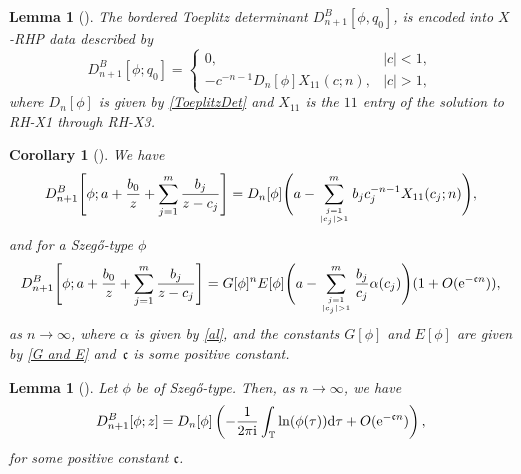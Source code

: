 \documentclass[10pt,a4paper]{amsart}
\numberwithin{equation}{section}
\newtheorem{Corollary}[Theorem]{Corollary}
\newtheorem{Lemma}[Theorem]{Lemma}
 { \theoremstyle{definition}
\newtheorem{Definition}[Theorem]{Definition}
\newtheorem{Example}[Theorem]{Example}
\newtheorem{Remark}[Theorem]{Remark}
\newtheorem{Question}[Theorem]{Question}
}
\newcommand{\T}{{\mathbb T}}
\newcommand{\al}{\alpha}
\newcommand{\di}{\displaystyle}
\newcommand{\ii}{{\rm i}}
\newcommand{\dd}{{\rm d}}
\begin{document}
	\begin{Lemma}[\cite{BEGIL}]\label{lemma 3.2}
		The bordered Toeplitz determinant $D^B_{n+1}[\phi,q_0]$, is encoded into $X$-RHP data described by
		\begin{equation}\label{psi=1/z-c 0}
			D^B_{n+1}[\phi;q_0] = \begin{cases}
				0, & |c|<1, \\
				-c^{-n-1}D_{n}[\phi]X_{11}(c;n), & |c|>1,
			\end{cases}
		\end{equation}
		where $D_{n}[\phi]$ is given by \eqref{ToeplitzDet} and $X_{11}$ is the $11$ entry of the solution to {\rm RH-X1} through {\rm RH-X3}.
	\end{Lemma}
	\begin{Corollary}[\cite{BEGIL}]\label{cor 1}
		We have
		\begin{gather*}%
			D^B_{n+1}\Bigg[\phi;\di a+\frac{b_0}{z}+\sum^{m}_{j=1}\frac{b_j }{z-c_j}\Bigg] = D_n[\phi] \Bigg(a -\sum^{m}_{j=1 \atop |c_j|>1 }b_j c^{-n-1}_jX_{11}(c_j;n)\Bigg),
		\end{gather*}
		and for a Szeg\H{o}-type $\phi$
		\begin{gather*}%
			D^B_{n+1}\Bigg[\phi;\di a+\frac{b_0}{z}+\sum^{m}_{j=1}\frac{b_j }{z-c_j}\Bigg] = G[\phi]^{n} E[\phi] \Bigg(a -\sum^{m}_{j=1 \atop |c_j|>1 }\frac{b_j}{c_j} \al(c_j)\Bigg)( 1 + O({\rm e}^{-\mathfrak{c}n})),
		\end{gather*}
		as $n \to \infty$, where $\al$ is given by \eqref{al}, and the constants $G[\phi]$ and $E[\phi]$ are given by \eqref{G and E} and~$\mathfrak{c}$ is some positive constant.
	\end{Corollary}
	
	\begin{Lemma}[\cite{BEGIL}]\label{psi=z}
		Let $\phi$ be of Szeg\H{o}-type. Then, as $n \to \infty$, we have
		\begin{gather*}%
			D^B_{n+1}[\phi;z] = D_n[\phi] \left(-\frac{1}{2\pi \ii} \int_{\T} \ln(\phi(\tau)) \dd \tau + O({\rm e}^{-\mathfrak{c}n})\right),
		\end{gather*}
		for some positive constant $\mathfrak{c}$.
	\end{Lemma}
	
\end{document}
